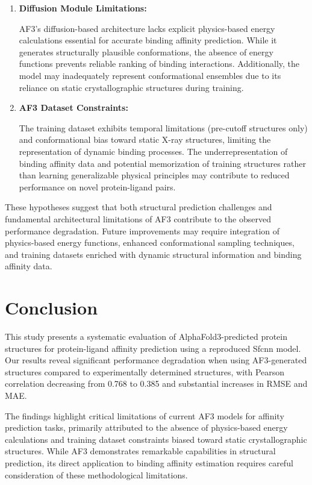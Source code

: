 \documentclass[unnumsec,webpdf,contemporary,large]{oup-authoring-template}
\theoremstyle{thmstyleone}%
\theoremstyle{thmstyletwo}%
\theoremstyle{thmstylethree}%
\begin{document}
\begin{enumerate}
    \item \textbf{Diffusion Module Limitations:} 
    
    AF3's diffusion-based architecture lacks explicit 
    physics-based energy calculations essential for accurate binding affinity prediction. 
    While it generates structurally plausible conformations, 
    the absence of energy functions prevents reliable ranking 
    of binding interactions. Additionally, 
    the model may inadequately represent conformational 
    ensembles due to its reliance on static crystallographic 
    structures during training.

    \item \textbf{AF3 Dataset Constraints:} 
     
    The training dataset exhibits temporal limitations 
    (pre-cutoff structures only) and conformational 
    bias toward static X-ray structures, 
    limiting the representation of dynamic binding processes. 
    The underrepresentation of binding affinity data and 
    potential memorization of training structures rather 
    than learning generalizable physical principles may 
    contribute to reduced performance on novel 
    protein-ligand pairs.

\end{enumerate}

These hypotheses suggest that both structural prediction challenges and fundamental architectural 
limitations of AF3 contribute to the observed performance degradation. Future improvements may require 
integration of physics-based energy functions, enhanced conformational sampling techniques, and 
training datasets enriched with dynamic structural information and binding affinity data.

\section{Conclusion}
This study presents a systematic evaluation of AlphaFold3-predicted protein structures 
for protein-ligand affinity prediction using a reproduced Sfcnn model. 
Our results reveal significant performance degradation when using AF3-generated structures 
compared to experimentally determined structures, with Pearson correlation decreasing from 
0.768 to 0.385 and substantial increases in RMSE and MAE. 

The findings highlight critical limitations of current AF3 models for affinity prediction tasks, 
primarily attributed to the absence of physics-based energy calculations and training dataset 
constraints biased toward static crystallographic structures. While AF3 demonstrates remarkable 
capabilities in structural prediction, its direct application to binding affinity estimation 
requires careful consideration of these methodological limitations.
\end{document}

